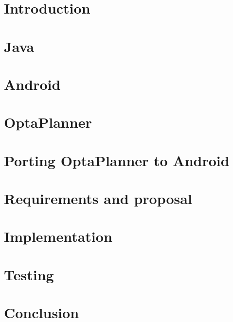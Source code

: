\chapter{Introduction}\label{IntroductionChapter}


\chapter{Java}\label{JavaChapter}


\chapter{Android}\label{AndroidChapter}


\chapter{OptaPlanner}\label{OptaPlannerChapter}


\chapter{Porting OptaPlanner to Android}\label{PortingChapter}


\chapter{Requirements and proposal}\label{ProposalChapter}


\chapter{Implementation}\label{ImplementationChapter}


\chapter{Testing}\label{TestingChapter}


\chapter{Conclusion}\label{ConclusionChapter}

